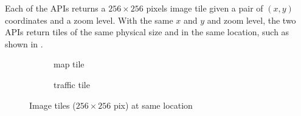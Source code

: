 Each of the APIs returns a $256\times256$ pixels image tile given 
a pair of $(x, y)$ coordinates and a zoom level. 
With the same $x$ and $y$ and zoom level, the two APIs return 
tiles of the same physical size and in the same location, such as shown in
.

\begin{figure}[th]
	\centering
	\begin{subfigure}[t]{0.4\columnwidth}
	\caption{map tile}
	\label{fig:baidutile}
	\end{subfigure}
	\hfill
	\begin{subfigure}[t]{0.4\columnwidth}
	\caption{traffic tile}
	\label{fig:baidutraffictile}
	\end{subfigure}
    \caption{Image tiles ($256\times 256$ pix) at same location}
    \label{fig:imageapi}
\end{figure}

%
